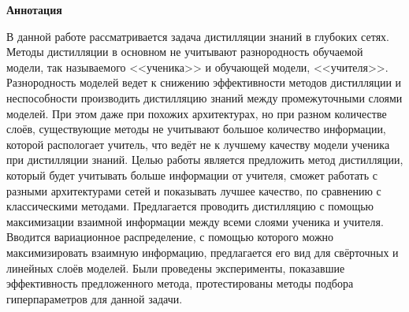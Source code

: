 \begin{center}
    \Large{\textbf{Аннотация}}
\end{center}

В данной работе рассматривается задача дистилляции знаний в глубоких сетях.
Методы дистилляции в основном не учитывают разнородность обучаемой модели, так называемого <<ученика>> и обучающей модели, <<учителя>>.
Разнородность моделей ведет к снижению эффективности методов дистилляции и неспособности производить дистилляцию знаний между промежуточными слоями моделей.
При этом даже при похожих архитектурах, но при разном количестве слоёв, существующие методы не учитывают большое количество информации,
которой распологает учитель, что ведёт не к лучшему качеству модели ученика при дистилляции знаний.
Целью работы является предложить метод дистилляции, который будет учитывать больше информации от учителя,
сможет работать с разными архитектурами сетей и показывать лучшее качество, по сравнению с классическими методами.
Предлагается проводить дистилляцию с помощью максимизации взаимной информации между всеми слоями ученика и учителя.
Вводится вариационное распределение, с помощью которого можно максимизировать взаимную информацию,
предлагается его вид для свёрточных и линейных слоёв моделей.
Были проведены эксперименты, показавшие эффективность предложенного метода,
протестированы методы подбора гиперпараметров для данной задачи.
